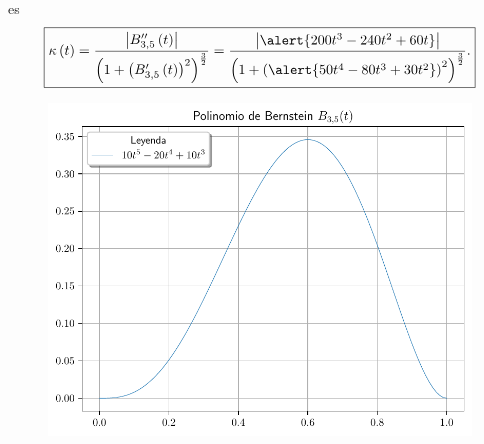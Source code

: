 \begin{frame}
\begin{solution}
        es
        \begin{equation*}
            \boxed{
            \kappa\left(t\right)=
            \dfrac{
                \left|
                B^{\prime\prime}_{3,5}\left(t\right)
                \right|
            }{
                {\left(
                        1+
                        {\left(B^{\prime}_{3,5}\left(t\right)\right)}^{2}
                        \right)}^{\frac{3}{2}}
            }=
            \dfrac{
            \left|
            \alert{200t^{3}-240t^{2}+60t}
            \right|
            }{
            {\left(
                    1+
                    {\left(\alert{50t^{4}-80t^{3}+30t^{2}}\right)}^{2}
                    \right)}^{\frac{3}{2}}
            }.
            }
        \end{equation*}
    \end{solution}
\end{frame}

\begin{frame}
    \begin{solution}
        \begin{figure}[ht!]
            \centering
            \includegraphics[width=.72\paperwidth]{p1}
        \end{figure}
    \end{solution}
\end{frame}

